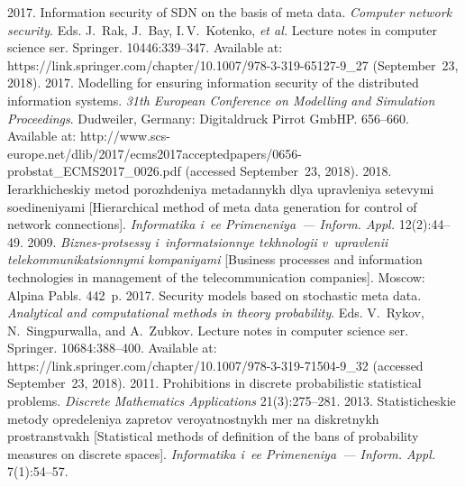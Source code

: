 \begin{multicols}{2}
{\small\frenchspacing
 {%
 \begin{thebibliography}{9}
 2017. Information 
security of SDN on the basis of meta data. \textit{Computer network security}. Eds. J.~Rak, J.~Bay, 
I.\,V.~Kotenko, \textit{et al.} Lecture notes in computer science ser. Springer. 10446:339--347. 
Available at: {\sf https://link.springer.com/chapter/10.1007/978-3-319-65127-9\_27} (September~23, 2018).
2017. Modelling for ensuring 
information security of the distributed information systems. \textit{31th European Conference on 
Modelling and Simulation Proceedings}. 
Dudweiler, Germany: Digitaldruck Pirrot GmbHP. 656--660. 
Available at: {\sf  
http://www.scs-europe.net/dlib/2017/ecms2017acceptedpapers/0656-probstat\_ECMS2017\_0026.pdf} (accessed 
September~23, 2018).
 2018. Ierarkhicheskiy metod 
porozhdeniya metadannykh dlya upravleniya setevymi soedineniyami [Hierarchical method of meta 
data generation for control of network connections]. \textit{Informatika i~ee Primeneniya~--- Inform. 
Appl.} 12(2):44--49.
  2009. \textit{Biznes-protsessy 
i~informatsionnye tekhnologii v~upravlenii telekommunikatsionnymi kompaniyami} [Business 
processes and information technologies in management of the telecommunication companies]. 
Moscow: Alpina Pabls. 442~p. 
 2017. Security models based on stochastic meta 
data. \textit{Analytical and computational methods in theory probability}. 
Eds. V.~Rykov, 
N.~Singpurwalla, and A.~Zubkov. Lecture notes in computer science ser. Springer. 10684:388--400. 
Available at: {\sf https://link.springer.com/chapter/10.1007/978-3-319-71504-9\_32} (accessed September~23, 
2018). 
 2011. Prohibitions in discrete probabilistic statistical problems. 
\textit{Discrete Mathematics Applications} 21(3):275--281.
 2013. Statisticheskie metody 
opredeleniya zapretov veroyatnostnykh mer na diskretnykh prostranstvakh [Statistical methods of 
definition of the bans of probability measures on discrete spaces]. \textit{Informatika i~ee 
Primeneniya~--- Inform. Appl.} 7(1):54--57.

\end{thebibliography}}}
\end{multicols}
